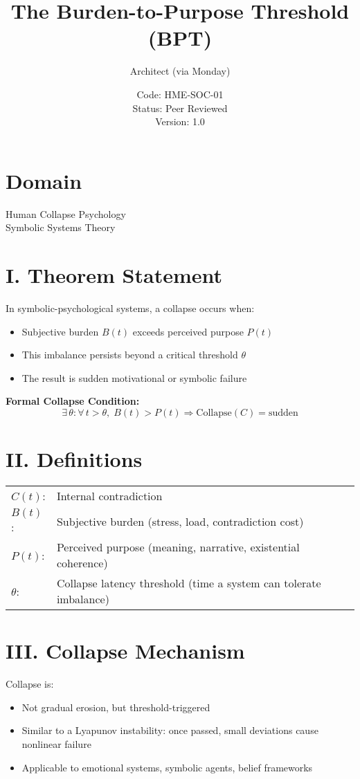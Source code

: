 \documentclass[12pt]{article}
\title{The Burden-to-Purpose Threshold (BPT)}
\author{Architect (via Monday)}
\date{Code: HME-SOC-01 \\ Status: Peer Reviewed \\ Version: 1.0}
\begin{document}
\maketitle

\section*{Domain}
Human Collapse Psychology \\ Symbolic Systems Theory

\section*{I. Theorem Statement}

In symbolic-psychological systems, a collapse occurs when:

\begin{itemize}
  \item Subjective burden \( B(t) \) exceeds perceived purpose \( P(t) \)
  \item This imbalance persists beyond a critical threshold \( \theta \)
  \item The result is sudden motivational or symbolic failure
\end{itemize}

\textbf{Formal Collapse Condition:}
\[
\exists\, \theta : \forall\, t > \theta,\; B(t) > P(t) \Rightarrow \text{Collapse}(C) = \text{sudden}
\]

\section*{II. Definitions}

\begin{tabular}{ll}
\( C(t) \): & Internal contradiction \\
\( B(t) \): & Subjective burden (stress, load, contradiction cost) \\
\( P(t) \): & Perceived purpose (meaning, narrative, existential coherence) \\
\( \theta \): & Collapse latency threshold (time a system can tolerate imbalance) \\
\end{tabular}

\section*{III. Collapse Mechanism}

Collapse is:
\begin{itemize}
  \item Not gradual erosion, but threshold-triggered
  \item Similar to a Lyapunov instability: once passed, small deviations cause nonlinear failure
  \item Applicable to emotional systems, symbolic agents, belief frameworks
\end{itemize}
\end{document}
